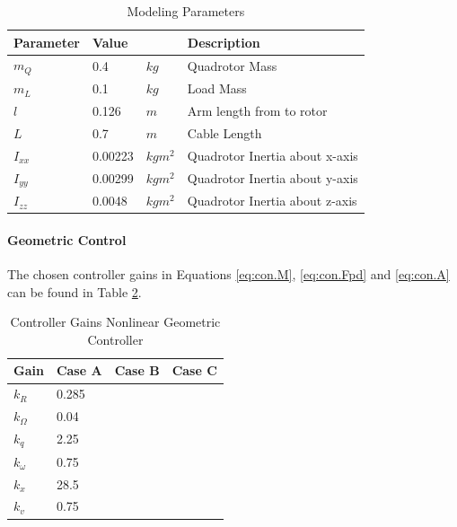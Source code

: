 \begin{table}[h!]
	\centering
	\begin{tabular}{|l|ll|l|}
		\hline
		\textbf{Parameter}&\textbf{Value}&&\textbf{Description}\\
		\hline
		$ m_Q $&0.4& $ kg $&Quadrotor Mass\\
		$ m_L $&0.1 &$ kg $&Load Mass\\
		$ l $&0.126& $ m $&Arm length from \a{qr} \a{cm} to rotor\\
		$ L $&0.7 &$ m $& Cable Length\\
		$ I_{xx} $&0.00223&$kgm^2 $&Quadrotor Inertia about x-axis\\
		$ I_{yy} $&0.00299&$kgm^2 $&Quadrotor Inertia about y-axis\\
		$ I_{zz} $&0.0048&$kgm^2 $&Quadrotor Inertia about z-axis\\
		\hline	
	\end{tabular}
	\caption{Modeling Parameters}
	\label{tab:set.par}
\end{table}

\paragraph{Geometric Control}
The chosen controller gains in Equations \ref{eq:con.M}, \ref{eq:con.Fpd} and \ref{eq:con.A} can be found in Table \ref{tab:set.gains}.

\begin{table}[h!]
	\centering
	\begin{tabular}{|l|l|l|l|}
		\hline
		\textbf{Gain}&\textbf{Case A}&\textbf{Case B}&\textbf{Case C}\\
		\hline
		$ k_R $&0.285&&\\
		$ k_\Omega $&0.04&&\\
		$ k_q $&2.25&&\\
		$ k_\omega $&0.75&&\\
		$ k_x $&28.5&&\\
		$ k_v $&0.75&&\\	
		\hline
	\end{tabular}
	\caption{Controller Gains Nonlinear Geometric Controller}
	\label{tab:set.gains}
\end{table}


